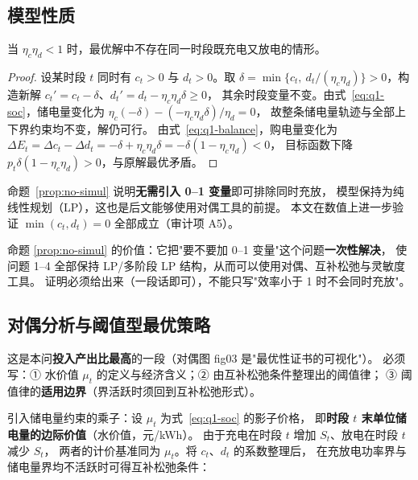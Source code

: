 \subsection{模型性质}

\begin{proposition}[充放互斥]\label{prop:no-simul}
当 \(\eta_c\eta_d<1\) 时，最优解中不存在同一时段既充电又放电的情形。
\end{proposition}

\begin{proof}
设某时段 \(t\) 同时有 \(c_t>0\) 与 \(d_t>0\)。取
\(\delta=\min\{c_t,\ d_t/(\eta_c\eta_d)\}>0\)，构造新解
\(c_t'=c_t-\delta\)、\(d_t'=d_t-\eta_c\eta_d\delta\ge 0\)，
其余时段变量不变。由式~\eqref{eq:q1-soc}，储电量变化为
\(\eta_c(-\delta)-(-\eta_c\eta_d\delta)/\eta_d=0\)，
故整条储电量轨迹与全部上下界约束均不变，解仍可行。
由式~\eqref{eq:q1-balance}，购电量变化为
\(\Delta E_t=\Delta c_t-\Delta d_t=-\delta+\eta_c\eta_d\delta=-\delta(1-\eta_c\eta_d)<0\)，
目标函数下降 \(p_t\delta(1-\eta_c\eta_d)>0\)，与原解最优矛盾。
\end{proof}

命题~\ref{prop:no-simul} 说明\textbf{无需引入 0--1 变量}即可排除同时充放，
模型保持为纯线性规划（LP），这也是后文能够使用对偶工具的前提。
本文在数值上进一步验证 \(\min(c_t,d_t)=0\) 全部成立（审计项 A5）。

\begin{guideblock}
命题 \ref{prop:no-simul} 的价值：它把"要不要加 0--1 变量"这个问题\textbf{一次性解决}，
使问题 1--4 全部保持 LP/多阶段 LP 结构，从而可以使用对偶、互补松弛与灵敏度工具。
证明必须给出来（一段话即可），不能只写"效率小于 1 时不会同时充放"。
\end{guideblock}

\subsection{对偶分析与阈值型最优策略}

\begin{guideblock}
这是本问\textbf{投入产出比最高}的一段（对偶图 fig03 是"最优性证书的可视化"）。
必须写：① 水价值 \(\mu_t\) 的定义与经济含义；② 由互补松弛条件整理出的阈值律；
③ 阈值律的\textbf{适用边界}（界活跃时须回到互补松弛形式）。
\end{guideblock}

引入储电量约束的乘子：设 \(\mu_t\) 为式~\eqref{eq:q1-soc} 的影子价格，
即\textbf{时段 \(t\) 末单位储电量的边际价值}（水价值，元/kWh）。
由于充电在时段 \(t\) 增加 \(S_t\)、放电在时段 \(t\) 减少 \(S_t\)，
两者的计价基准同为 \(\mu_t\)。将 \(c_t\)、\(d_t\) 的系数整理后，
在充放电功率界与储电量界均不活跃时可得互补松弛条件：

